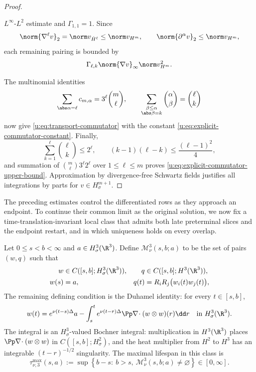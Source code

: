 \begin{proof}
\begin{samepage}
\(L^\infty\)-\(L^2\) estimate and \(\Gamma_{1,1}=1\).  Since
\[
 \norm{\nabla^\ell v}_2=\norm v_{\dot H^\ell}\le\norm v_{H^m},
 \qquad
 \norm{\partial^\alpha v}_2\le\norm v_{H^m},
\]
each remaining pairing is bounded by
\[
 \Gamma_{\ell,k}\norm{\nabla v}_\infty\norm v_{H^m}^2.
\]
\par
\end{samepage}
The multinomial identities
\[
 \sum_{\abs\alpha=\ell}c_{m,\alpha}
 =3^\ell\binom m\ell,
 \qquad
 \sum_{\substack{\beta\le\alpha\\\abs\beta=k}}
 \binom\alpha\beta=\binom\ell k
\]
now give \eqref{u:eq:transport-commutator} with the constant
\eqref{u:eq:explicit-commutator-constant}.  Finally,
\[
 \sum_{k=1}^{\ell}\binom\ell k\le2^\ell,
 \qquad
 (k-1)(\ell-k)\le\frac{(\ell-1)^2}{4},
\]
and summation of
\(
 \binom m\ell3^\ell2^\ell
\)
over \(1\le\ell\le m\) proves
\eqref{u:eq:explicit-commutator-upper-bound}.  Approximation by divergence-free
Schwartz fields justifies all integrations by parts for
\(v\in H^{m+1}_\sigma\).
\end{proof}

The preceding estimates control the differentiated rows as they approach an
endpoint.  To continue their common limit as the original solution, we now fix a
time-translation-invariant local class that admits both late preterminal
slices and the endpoint restart, and in which uniqueness holds on every
overlap.

\begin{definition}
\label{u:def:shifted-normalized-H3-mild-class}
Let \(0\le s<b<\infty\) and \(a\in H^3_\sigma(\R^3)\).  Define
\(\mathscr M_\nu^3(s,b;a)\) to be the set of pairs \((w,q)\) such that
\begin{align}
 w&\in C([s,b];H^3_\sigma(\R^3)),
 &q&\in C([s,b];H^3(\R^3)),
 \label{u:eq:shifted-mild-class-spaces}\\
 w(s)&=a,
 &q(t)&=R_iR_j\bigl(w_i(t)w_j(t)\bigr),
 \label{u:eq:shifted-mild-class-datum-pressure}
\end{align}
The remaining defining condition is the Duhamel identity: for every
\(t\in[s,b]\),
\begin{equation}
 w(t)=e^{\nu(t-s)\Delta}a
 -\int_s^t e^{\nu(t-r)\Delta}
 \Pp\nabla\!\cdot(w\otimes w)(r)\dd r
 \quad\text{in }H^3_\sigma(\R^3).
 \label{u:eq:shifted-mild-class-duhamel}
\end{equation}
The integral is an \(H^3_\sigma\)-valued Bochner integral: multiplication in
\(H^3(\R^3)\) places
\(\Pp\nabla\!\cdot(w\otimes w)\) in \(C([s,b];H^2_\sigma)\), and the heat
multiplier from \(H^2\) to \(H^3\) has an integrable
\((t-r)^{-1/2}\) singularity.
The maximal lifespan in this class is
\begin{equation}
 \tau_{\nu,3}^{\max}(s,a)
 :=\sup\left\{b-s:\ b>s,\
 \mathscr M_\nu^3(s,b;a)\ne\varnothing\right\}\in[0,\infty].
 \label{u:eq:shifted-mild-maximal-lifespan}
\end{equation}
\end{definition}

